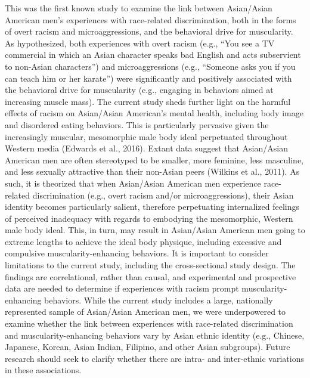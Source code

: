\documentclass[
  english,
  man, fleqn, noextraspace,floatsintext]{apa6}
\begin{document}
This was the first known study to examine the link between Asian/Asian American men's experiences with race-related discrimination, both in the forms of overt racism and microaggressions, and the behavioral drive for muscularity. As hypothesized, both experiences with overt racism (e.g., ``You see a TV commercial in which an Asian character speaks bad English and acts subservient to non-Asian characters'') and microaggressions (e.g., ``Someone asks you if you can teach him or her karate'') were significantly and positively associated with the behavioral drive for muscularity (e.g., engaging in behaviors aimed at increasing muscle mass).
The current study sheds further light on the harmful effects of racism on Asian/Asian American's mental health, including body image and disordered eating behaviors. This is particularly pervasive given the increasingly muscular, mesomorphic male body ideal perpetuated throughout Western media (Edwards et al., 2016). Extant data suggest that Asian/Asian American men are often stereotyped to be smaller, more feminine, less masculine, and less sexually attractive than their non-Asian peers (Wilkins et al., 2011). As such, it is theorized that when Asian/Asian American men experience race-related discrimination (e.g., overt racism and/or microaggressions), their Asian identity becomes particularly salient, therefore perpetuating internalized feelings of perceived inadequacy with regards to embodying the mesomorphic, Western male body ideal. This, in turn, may result in Asian/Asian American men going to extreme lengths to achieve the ideal body physique, including excessive and compulsive muscularity-enhancing behaviors.
It is important to consider limitations to the current study, including the cross-sectional study design. The findings are correlational, rather than causal, and experimental and prospective data are needed to determine if experiences with racism prompt muscularity-enhancing behaviors. While the current study includes a large, nationally represented sample of Asian/Asian American men, we were underpowered to examine whether the link between experiences with race-related discrimination and muscularity-enhancing behaviors vary by Asian ethnic identity (e.g., Chinese, Japanese, Korean, Asian Indian, Filipino, and other Asian subgroups). Future research should seek to clarify whether there are intra- and inter-ethnic variations in these associations.
\end{document}
